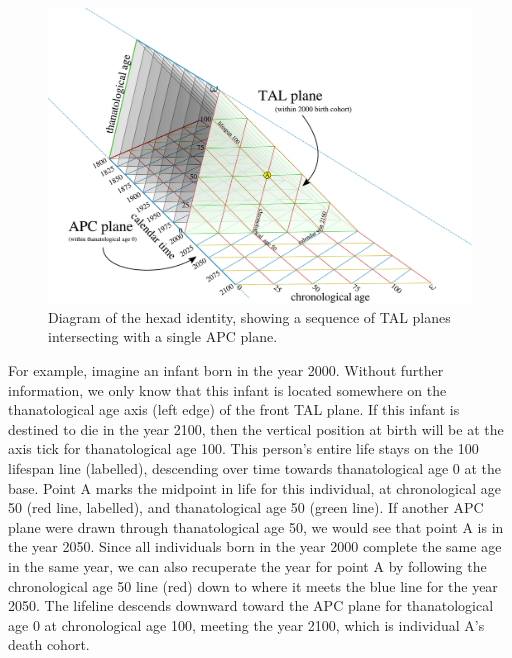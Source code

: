 \documentclass[12pt,oneside,a4paper]{article} %
\theoremstyle{definition}
\begin{document}
\begin{figure}[!h]
\centering
\caption[cap]{Diagram of the hexad identity, showing a sequence of TAL
planes intersecting with a single APC plane.}
\label{fig:apctTAL}
\includegraphics[scale=.5]{Figures/TALisomarkedup2.pdf}
\end{figure}

For example, imagine an infant born in the year 2000. Without further
information, we only know that this infant is located somewhere on the
thanatological age axis (left edge) of the front TAL plane. If this infant is
destined to die in the year 2100, then the vertical position at birth will be at the axis tick for thanatological age 100. This
person's entire life stays on the 100 lifespan line (labelled),
descending over time towards thanatological age 0 at the base. Point A marks the
midpoint in life for this individual, at chronological age 50 (red line, labelled), and
thanatological age 50 (green line). If another APC plane were drawn through thanatological age 50, we would see that point A is in the year 2050. Since all individuals born in the year 2000 complete the same age in the same year, we can
also recuperate the year for point A by following the chronological age 50 line
(red) down to where it meets the blue line for the year 2050. The lifeline
descends downward toward the APC plane for thanatological age 0 at chronological
age 100, meeting the year 2100, which is individual A's death cohort.
\end{document}
